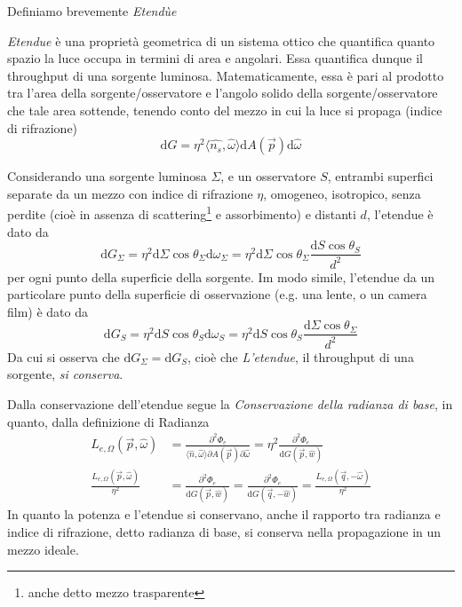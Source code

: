 Definiamo brevemente \textit{Etend\`ue}
\begin{definitionS}
	\textit{Etendue} \`e una propriet\`a geometrica di un sistema ottico che quantifica quanto spazio la luce occupa in termini di area e angolari.
	Essa quantifica dunque il throughput di una sorgente luminosa. Matematicamente, essa \`e pari al prodotto tra l'area della sorgente/osservatore 
	e l'angolo solido della sorgente/osservatore che tale area sottende, tenendo conto del mezzo in cui la luce si propaga (indice di rifrazione)
	\[ \mathrm{d}G = \eta^2\langle \hat{n_s},\hat{\omega} \rangle\mathrm{d}A(\vec{p})\mathrm{d}\hat{\omega}\]
\end{definitionS}
Considerando una sorgente luminosa $\Sigma$, e un osservatore $S$, entrambi superfici separate da un mezzo con indice di rifrazione $\eta$, omogeneo,
isotropico, senza perdite (cio\`e in assenza di scattering\footnote{anche detto mezzo trasparente} e assorbimento) e distanti $d$, l'etendue \`e dato da
\[ \mathrm{d}G_\Sigma = \eta^2\mathrm{d}\Sigma\cos\theta_\Sigma\mathrm{d}\omega_\Sigma 
					  = \eta^2\mathrm{d}\Sigma\cos\theta_\Sigma\frac{\mathrm{d}S\cos\theta_S}{d^2} \]
per ogni punto della superficie della sorgente. Im modo simile, l'etendue da un particolare punto della superficie di osservazione (e.g. una lente, o
un camera film) \`e dato da
\[ \mathrm{d}G_S = \eta^2\mathrm{d}S\cos\theta_S\mathrm{d}\omega_S 
				 = \eta^2\mathrm{d}S\cos\theta_S\frac{\mathrm{d}\Sigma\cos\theta_\Sigma}{d^2}\]
Da cui si osserva che $\mathrm{d}G_\Sigma = \mathrm{d}G_S$, cio\`e che \textit{L'etendue}, il throughput di una sorgente, \textit{si conserva}.\par
Dalla conservazione dell'etendue segue la \textit{Conservazione della radianza di base}, in quanto, dalla definizione di \gls{Radianza}
\begin{align} \label{chapter1:basicRadiance}
	L_{e,\Omega}(\vec{p}, \hat{\omega}) &= \frac{\partial^2\Phi_e}{\langle\hat{n},\hat{\omega}\rangle\partial A(\vec{p})\partial\hat{\omega}} 
						   = \eta^2\frac{\partial^2\Phi_e}{\mathrm{d}G(\vec{p},\hat{w})}\\
	\frac{L_{e,\Omega}(\vec{p}, \hat{\omega})}{\eta^2} &= \frac{\partial^2\Phi_e}{\mathrm{d}G(\vec{p},\hat{w})}
		= \frac{\partial^2\Phi_e}{\mathrm{d}G(\vec{q},-\hat{w})} = \frac{L_{e,\Omega}(\vec{q}, -\hat{\omega})}{\eta^2}
\end{align}
In quanto la potenza e l'etendue si conservano, anche il rapporto tra radianza e indice di rifrazione, detto radianza di base, si conserva nella 
propagazione in un mezzo ideale.\par
